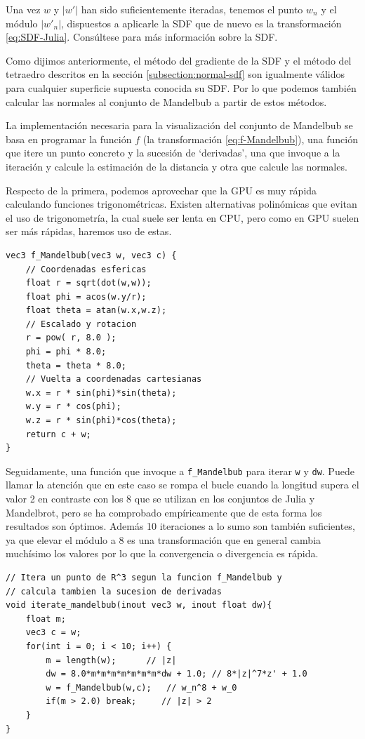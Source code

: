 Una vez $w$ y $|w'|$ han sido suficientemente iteradas, tenemos el punto $w_n$ y el módulo $|w'_n|$, dispuestos a aplicarle la SDF que de nuevo es la transformación \ref{eq:SDF-Julia}. Consúltese \cite{mandelbub} para más información sobre la SDF.

Como dijimos anteriormente, el método del gradiente de la SDF y el método del tetraedro descritos en la sección \ref{subsection:normal-sdf} son igualmente válidos para cualquier superficie supuesta conocida su SDF. Por lo que podemos también calcular las normales al conjunto de Mandelbub a partir de estos métodos.

La implementación necesaria para la visualización del conjunto de Mandelbub se basa en programar la función $f$ (la transformación \ref{eq:f-Mandelbub}), una función que itere un punto concreto y la sucesión de `derivadas', una que invoque a la iteración y calcule la estimación de la distancia y otra que calcule las normales.

Respecto de la primera, podemos aprovechar que la GPU es muy rápida calculando funciones trigonométricas. Existen alternativas polinómicas que evitan el uso de trigonometría, la cual suele ser lenta en CPU, pero como en GPU suelen ser más rápidas, haremos uso de estas. 
\begin{lstlisting}
vec3 f_Mandelbub(vec3 w, vec3 c) {
    // Coordenadas esfericas
    float r = sqrt(dot(w,w));
    float phi = acos(w.y/r);
    float theta = atan(w.x,w.z);
    // Escalado y rotacion
    r = pow( r, 8.0 );
    phi = phi * 8.0;
    theta = theta * 8.0;
    // Vuelta a coordenadas cartesianas
    w.x = r * sin(phi)*sin(theta);
    w.y = r * cos(phi);
    w.z = r * sin(phi)*cos(theta);
    return c + w;
}
\end{lstlisting}

Seguidamente, una función que invoque a \verb|f_Mandelbub| para iterar \verb|w| y \verb|dw|. Puede llamar la atención que en este caso se rompa el bucle cuando la longitud supera el valor 2 en contraste con los 8 que se utilizan en los conjuntos de Julia y Mandelbrot, pero se ha comprobado empíricamente que de esta forma los resultados son óptimos. Además 10 iteraciones a lo sumo son también suficientes, ya que elevar el módulo a $8$ es una transformación que en general cambia muchísimo los valores por lo que la convergencia o divergencia es rápida.

\begin{lstlisting}
// Itera un punto de R^3 segun la funcion f_Mandelbub y
// calcula tambien la sucesion de derivadas
void iterate_mandelbub(inout vec3 w, inout float dw){
    float m;
    vec3 c = w;
    for(int i = 0; i < 10; i++) {
        m = length(w);      // |z|
        dw = 8.0*m*m*m*m*m*m*m*dw + 1.0; // 8*|z|^7*z' + 1.0
        w = f_Mandelbub(w,c);   // w_n^8 + w_0
        if(m > 2.0) break;     // |z| > 2
    }
}
\end{lstlisting}

